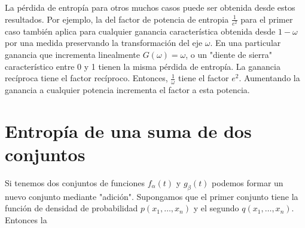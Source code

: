 La p\'erdida de entrop\'ia para otros muchos casos puede ser obtenida
desde estos resultados. Por ejemplo, la del factor de potencia de
entrop\;ia $\frac{1}{e^{2}}$ para el primer caso tambi\'en aplica para
cualquier ganancia caracter\'istica obtenida desde $1-\omega$ por una
medida preservando la transformaci\'on del eje $\omega$. En una
particular ganancia que incrementa linealmente $G \left (\omega
\right) = \omega$, o un "diente de sierra" caracter\'istico entre 0 y
1 tienen la misma p\'erdida de entrop\'ia. La ganancia rec\'iproca
tiene el factor rec\'iproco. Entonces, $\frac{1}{\omega}$ tiene el
factor $e^{2}$. Aumentando la ganancia a cualquier potencia incrementa
el factor a esta potencia. 

\section{Entrop\'ia de una suma de dos conjuntos}
\label{s23}

Si tenemos dos conjuntos de funciones $f_{\alpha} \left( t \right)$ y
$g_{\beta} \left( t \right)$ podemos formar un nuevo conjunto mediante
"adici\'on". Supongamos que el primer conjunto tiene la funci\'on de
densidad de probabilidad $p \left( x_{1}, \dots , x_{n} \right)$ y el
segundo $q \left( x_{1}, \dots , x_{n} \right)$. Entonces la


